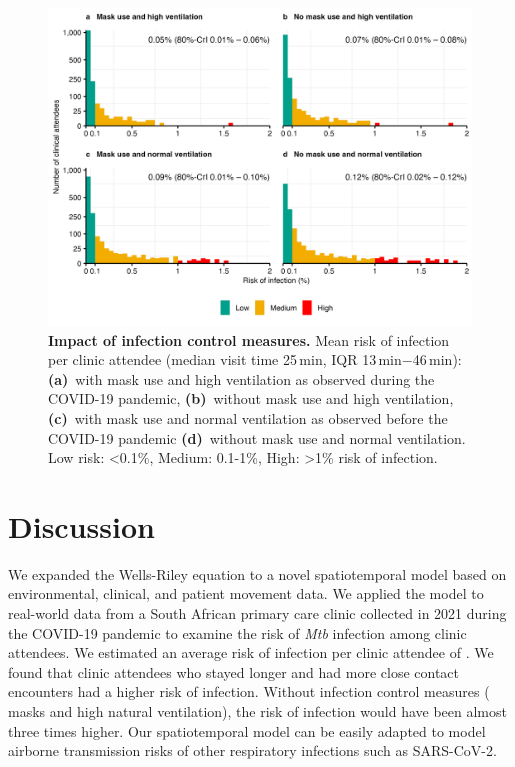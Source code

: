 \documentclass[fleqn,11pt]{wlscirep}
\begin{document}
\begin{figure}
    \centering
    \includegraphics{results/modeling/mean-roi-comparison.png}
    \caption{\textbf{Impact of infection control measures.} Mean risk of infection per clinic attendee (median visit time 25\,min, IQR 13\,min$-$46\,min): \textbf{(a)}~with mask use  and high ventilation as observed during the COVID-19 pandemic, \textbf{(b)}~without mask use and high ventilation, \textbf{(c)}~with mask use and normal ventilation as observed before the COVID-19 pandemic  \textbf{(d)}~without mask use and normal ventilation. Low risk: <0.1\%, Medium: 0.1-1\%, High: >1\% risk of infection.}
    \label{fig:scenario-results}
\end{figure}

\FloatBarrier

\newpage

\section*{Discussion}

We expanded the Wells-Riley equation to a novel spatiotemporal model based on environmental, clinical, and patient movement data. We applied the model to real-world data from a South African primary care clinic collected in 2021 during the COVID-19 pandemic to examine the risk of \emph{Mtb} infection among clinic attendees. We estimated an average risk of infection per clinic attendee of . We found that clinic attendees who stayed longer and had more close contact encounters had a higher risk of infection. Without infection control measures ( masks and high natural ventilation), the risk of infection would have been almost three times higher. Our spatiotemporal model can be easily adapted to model airborne transmission risks of other respiratory infections such as SARS-CoV-2.
\end{document}
